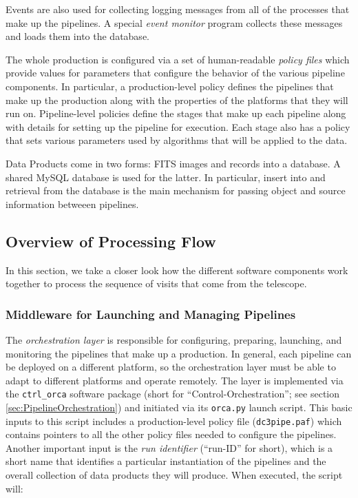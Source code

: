 Events are also used for collecting logging messages from all of the
processes that make up the pipelines.  A special \textit{event
monitor} program collects these messages and loads them into the
database.  

The whole production is configured via a set of human-readable
\textit{policy files} which provide values for parameters that
configure the behavior of the various pipeline components.  In
particular, a production-level policy defines the pipelines that
make up the production along with the properties of the platforms that
they will run on.  Pipeline-level policies define the stages that make
up each pipeline along with details for setting up the pipeline for
execution.  Each stage also has a policy that sets various parameters
used by algorithms that will be applied to the data.  

Data Products come in two forms: FITS images and records into a
database.  A shared MySQL database is used for the latter.  In
particular, insert into and retrieval from the database is the main
mechanism for passing object and source information betweeen
pipelines.  

\subsection{Overview of Processing Flow}

In this section, we take a closer look how the different software
components work together to process the sequence of visits that come
from the telescope.  

\subsubsection{Middleware for Launching and Managing Pipelines} 
\label{sec:orcaintro}

The \textit{orchestration layer} is responsible for configuring,
preparing, launching, and monitoring the pipelines that make up a
production.  In general, each pipeline can be deployed on a different
platform, so the orchestration layer must be able to adapt to
different platforms and operate remotely.  The layer is implemented
via the \texttt{ctrl\_orca} software package (short for
``Control-Orchestration''; see section \ref{sec:PipelineOrchestration})
and initiated via its \texttt{orca.py} launch script.  This basic
inputs to this script includes a production-level policy file
(\texttt{dc3pipe.paf}) which contains pointers to all the other policy
files needed to configure the pipelines.  Another important input is
the \textit{run identifier} (``run-ID'' for short), which is a
short name that identifies a particular instantiation of the pipelines
and the overall collection of data products they will produce.  When
executed, the script will:  

